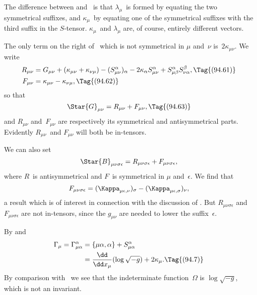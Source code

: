 \documentclass[12pt]{book}
\begin{document}
The difference between  and~ is that $\lambda_{\mu}$~is formed by equating
the two symmetrical suffixes, and $\kappa_{\mu}$~by equating one of the symmetrical
suffixes with the third suffix in the $S$-tensor. $\kappa_{\mu}$~and $\lambda_{\mu}$ are, of course, entirely
different vectors.

The only term on the right of~ which is not symmetrical in $\mu$ and~$\nu$
is~$2\kappa_{\mu\nu}$. We write
\begin{align*}
  R_{\mu\nu} &= G_{\mu\nu} + (\kappa_{\mu\nu} + \kappa_{\nu\mu})
  - (S_{\mu\nu}^{\alpha})_{\alpha} - 2\kappa_{\alpha} S_{\mu\nu}^{\alpha}
  + S_{\mu\beta}^{\alpha} S_{\nu\alpha}^{\beta},
  \Tag{(94.61)} \\
  F_{\mu\nu} &= \kappa_{\mu\nu} - \kappa_{\nu\mu},
  \Tag{(94.62)}
\end{align*}
so that
\[
\Star{G}_{\mu\nu} = R_{\mu\nu} + F_{\mu\nu},
\Tag{(94.63)}
\]
and $R_{\mu\nu}$ and~$F_{\mu\nu}$ are respectively its symmetrical and antisymmetrical parts.
Evidently $R_{\mu\nu}$~and $F_{\mu\nu}$ will both be in-tensors.

We can also set
\[
\Star{B}_{\mu\nu\sigma\epsilon} = R_{\mu\nu\sigma\epsilon} + F_{\mu\nu\sigma\epsilon},
\]
where $R$~is antisymmetrical and $F$~is symmetrical in $\mu$ and~$\epsilon$. We find that
%
\[
F_{\mu\nu\sigma\epsilon} = (\Kappa_{\mu\epsilon,\nu})_{\sigma} - (\Kappa_{\mu\epsilon,\sigma})_{\nu},
\]
a result which is of interest in connection with the discussion of . But
$R_{\mu\nu\sigma\epsilon}$ and $F_{\mu\nu\sigma\epsilon}$ are not in-tensors, since the $g_{\mu\nu}$ are needed to lower the suffix~$\epsilon$.

By  and~
\begin{align*}
  \Gamma_{\mu} = \Gamma_{\mu\alpha}^{\alpha}
  &= \{\mu\alpha, \alpha\} + S_{\mu\alpha}^{\alpha} \\
  &= \frac{\dd}{\dd x_{\mu}} (\log \sqrt{-g}) + 2\kappa_{\mu}.
  \Tag{(94.7)}
\end{align*}
By comparison with~ we see that the indeterminate function~$\Omega$ is
$\log \sqrt{-g}$, which is not an invariant.

%
%
\end{document}
